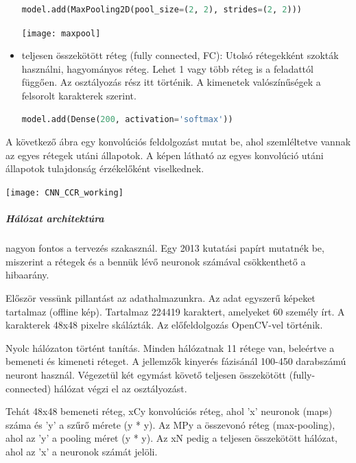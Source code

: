 \begin{itemize}
\begin{lstlisting}[language=Python]
model.add(MaxPooling2D(pool_size=(2, 2), strides=(2, 2)))
\end{lstlisting}

\begin{center}
\texttt{[image: maxpool]}
\end{center}

\item teljesen összekötött réteg (fully connected, FC): Utolsó rétegekként szokták használni, hagyományos réteg. Lehet 1 vagy több réteg is a feladattól függően. Az osztályozás rész itt történik. A kimenetek valószínűségek a felsorolt karakterek szerint.
\begin{lstlisting}[language=Python]
model.add(Dense(200, activation='softmax'))
\end{lstlisting}
\end{itemize}

A következő ábra egy konvolúciós feldolgozást mutat be, ahol szemléltetve vannak az egyes rétegek utáni állapotok. A képen látható az egyes konvolúció utáni állapotok tulajdonság érzékelőként viselkednek.

\begin{center}
\texttt{[image: CNN\_CCR\_working]}
\end{center}

\subparagraph{Hálózat architektúra}

nagyon fontos a tervezés szakasznál. Egy 2013 kutatási papírt mutatnék be, miszerint a rétegek és a bennük lévő neuronok számával csökkenthető a hibaarány.

Először vessünk pillantást az adathalmazunkra. Az adat egyszerű képeket tartalmaz (offline kép). Tartalmaz 224419 karaktert, amelyeket 60 személy írt. A karakterek 48x48 pixelre skálázták. Az előfeldolgozás OpenCV-vel történik.

Nyolc hálózaton történt tanítás. Minden hálózatnak 11 rétege van, beleértve a bemeneti és kimeneti réteget. A jellemzők kinyerés fázisánál 100-450 darabszámú neuront használ. Végezetül két egymást követő teljesen összekötött (fully-connected) hálózat végzi el az osztályozást.

Tehát 48x48 bemeneti réteg, xCy konvolúciós réteg, ahol 'x' neuronok (maps) száma és 'y' a szűrő mérete (y * y). Az MPy a összevonó réteg (max-pooling), ahol az 'y' a pooling méret (y * y). Az xN pedig a teljesen összekötött hálózat, ahol az 'x' a neuronok számát jelöli.

